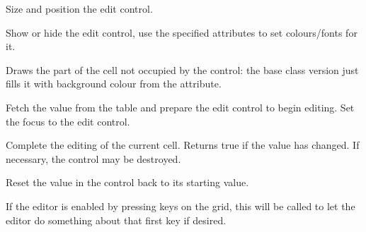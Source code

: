 
Size and position the edit control.

\label{wxgridcelleditorshow}


Show or hide the edit control, use the specified attributes to set
colours/fonts for it.

\label{wxgridcelleditorpaintbackground}


Draws the part of the cell not occupied by the control: the base class
version just fills it with background colour from the attribute.

\label{wxgridcelleditorbeginedit}


Fetch the value from the table and prepare the edit control
to begin editing. Set the focus to the edit control.

\label{wxgridcelleditorendedit}


Complete the editing of the current cell. Returns true if the value has
changed. If necessary, the control may be destroyed.

\label{wxgridcelleditorreset}


Reset the value in the control back to its starting value.

\label{wxgridcelleditorstartingkey}


If the editor is enabled by pressing keys on the grid,
this will be called to let the editor do something about
that first key if desired.

\label{wxgridcelleditorstartingclick}


